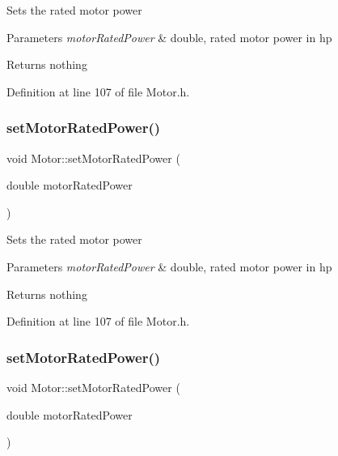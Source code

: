 Sets the rated motor power


\begin{DoxyParams}{Parameters}
{\em motor\+Rated\+Power} & double, rated motor power in hp\\
\hline
\end{DoxyParams}
\begin{DoxyReturn}{Returns}
nothing 
\end{DoxyReturn}


Definition at line 107 of file Motor.\+h.

\mbox{\label{class_motor_aa01f82db13c71b045b05e49f42ba46e9}} 
\subsubsection{\texorpdfstring{set\+Motor\+Rated\+Power()}{setMotorRatedPower()}\hspace{0.1cm}{\footnotesize\ttfamily [2/3]}}
{\footnotesize\ttfamily void Motor\+::set\+Motor\+Rated\+Power (\begin{DoxyParamCaption}\item[{double}]{motor\+Rated\+Power }\end{DoxyParamCaption})\hspace{0.3cm}{\ttfamily [inline]}}

Sets the rated motor power


\begin{DoxyParams}{Parameters}
{\em motor\+Rated\+Power} & double, rated motor power in hp\\
\hline
\end{DoxyParams}
\begin{DoxyReturn}{Returns}
nothing 
\end{DoxyReturn}


Definition at line 107 of file Motor.\+h.

\mbox{\label{class_motor_aa01f82db13c71b045b05e49f42ba46e9}} 
\subsubsection{\texorpdfstring{set\+Motor\+Rated\+Power()}{setMotorRatedPower()}\hspace{0.1cm}{\footnotesize\ttfamily [3/3]}}
{\footnotesize\ttfamily void Motor\+::set\+Motor\+Rated\+Power (\begin{DoxyParamCaption}\item[{double}]{motor\+Rated\+Power }\end{DoxyParamCaption})\hspace{0.3cm}{\ttfamily [inline]}}

